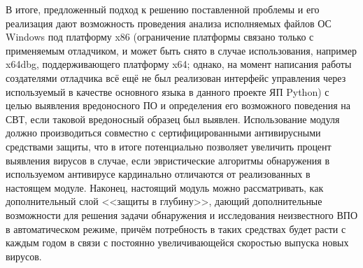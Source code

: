 В итоге, предложенный подход к решению поставленной проблемы и его реализация дают возможность проведения анализа исполняемых файлов ОС Windows под платформу x86 (ограничение платформы связано только с применяемым отладчиком, и может быть снято в случае использования, например x64dbg, поддерживающего платформу x64; однако, на момент написания работы создателями отладчика всё ещё не был реализован интерфейс управления через используемый в качестве основного языка в данного проекте ЯП Python) с целью выявления вредоносного ПО и определения его возможного поведения на СВТ, если таковой вредоносный образец был выявлен. Использование модуля должно производиться совместно с сертифицированными антивирусными средствами защиты, что в итоге потенциально позволяет увеличить процент выявления вирусов в случае, если эвристические алгоритмы обнаружения в используемом антивирусе кардинально отличаются от реализованных в настоящем модуле. Наконец, настоящий модуль можно рассматривать, как дополнительный слой <<защиты в глубину>>, дающий дополнительные возможности для решения задачи обнаружения и исследования неизвестного ВПО в автоматическом режиме, причём потребность в таких средствах будет расти с каждым годом в связи с постоянно увеличивающейся скоростью выпуска новых вирусов.